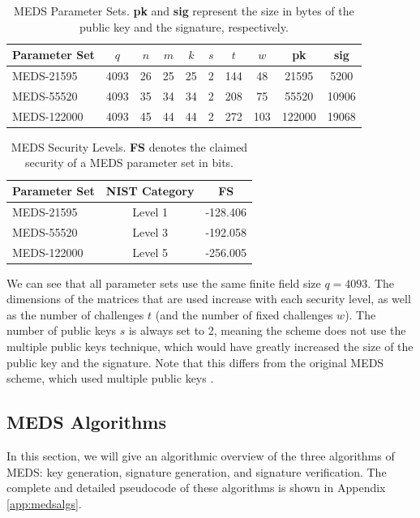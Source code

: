 \documentclass[11pt,a4paper]{report}
\theoremstyle{definition}
\begin{document}
\begin{table}
  \centering
  \begin{tabular}{lccccccccc}
    \toprule
    \textbf{Parameter Set} & \textbf{$q$} & \textbf{$n$} & \textbf{$m$} & \textbf{$k$} & \textbf{$s$} & \textbf{$t$} & \textbf{$w$} & \textbf{pk} & \textbf{sig} \\
    \midrule
    MEDS-21595 & 4093 & 26 & 25 & 25 & 2 & 144 & 48 & 21595 & 5200 \\
    MEDS-55520 & 4093 & 35 & 34 & 34 & 2 & 208 & 75 & 55520 & 10906 \\
    MEDS-122000 & 4093 & 45 & 44 & 44 & 2 & 272 & 103 & 122000 & 19068 \\
    \bottomrule
  \end{tabular}
  \caption{MEDS Parameter Sets. \textbf{pk} and \textbf{sig} represent the size in bytes of the public key and the signature, respectively.}
  \label{tab:medsparametersets}
\end{table}

\begin{table}
  \centering
  \begin{tabular}{lcc}
    \toprule
    \textbf{Parameter Set} & \textbf{NIST Category} & \textbf{FS} \\
    \midrule
    MEDS-21595 & Level 1 & -128.406 \\
    MEDS-55520 & Level 3 & -192.058 \\
    MEDS-122000 & Level 5 & -256.005 \\
    \bottomrule
  \end{tabular}
  \caption{MEDS Security Levels. \textbf{FS} denotes the claimed security of a MEDS parameter set in bits.}
  \label{tab:medssecuritylevels}
\end{table}

We can see that all parameter sets use the same finite field size $q = 4093$. The dimensions of the matrices that are used increase with each security level, as well as the number of challenges $t$ (and the number of fixed challenges $w$). The number of public keys $s$ is always set to 2, meaning the scheme does not use the multiple public keys technique, which would have greatly increased the size of the public key and the signature. Note that this differs from the original MEDS scheme, which used multiple public keys \cite{chou2023meds}.

\subsection{MEDS Algorithms}
\label{sec:medsalgorithms}
In this section, we will give an algorithmic overview of the three algorithms of MEDS: key generation, signature generation, and signature verification. The complete and detailed pseudocode of these algorithms is shown in Appendix \ref{app:medsalgs}.
\end{document}
